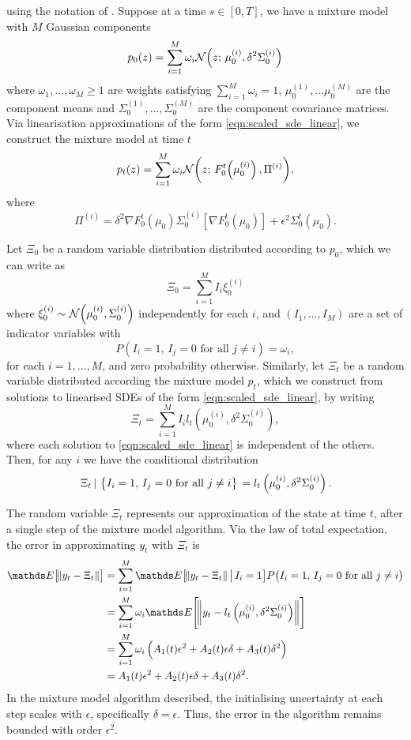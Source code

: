 using the notation of .
Suppose at a time \(s \in [0,T]\), we have a mixture model with \(M\) Gaussian components
\[
	p_0\!\left(z\right) = \sum_{i=1}^{M}{\omega_i\mathcal{N}\!\left(z;\, \mu_0^{(i)}, \delta^2\Sigma_0^{(i)}\right)}
\]
where \(\omega_1,\dotsc, \omega_M \geq 1\) are weights satisfying \(\sum_{i=1}^M{\omega_i} = 1\), \(\mu_0^{(1)}, \dots \mu_0^{(M)}\) are the component means and \(\Sigma_0^{(1)}, \dotsc, \Sigma_0^{(M)}\) are the component covariance matrices.
Via linearisation approximations of the form \eqref{eqn:scaled_sde_linear}, we construct the mixture model at time \(t\)
\[
	p_t\!\left(z\right) = \sum_{i=1}^{M}{\omega_i\mathcal{N}\!\left(z; \, F_0^t\!\left(\mu_0^{(i)}\right), \Pi^{(i)}\right)},
\]
where
\[
	\Pi^{(i)} = \delta^2 \nabla F_0^t\!\left(\mu_0\right) \Sigma_0^{(i)} \left[\nabla F_0^t\!\left(\mu_0\right)\right] + \epsilon^2 \Sigma_0^t\!\left(\mu_0\right).
\]

Let \(\Xi_0\) be a random variable distribution distributed according to \(p_0\), which we can write as
\[
	\Xi_0 = \sum_{i=1}^{M}{I_i \xi_0^{(i)}}
\]
where \(\xi_0^{(i)} \sim\mathcal{N}\!\left(\mu_0^{(i)}, \Sigma_0^{(i)}\right)\) independently for each \(i\), and \(\left(I_1, \dotsc, I_M\right)\) are a set of indicator variables with
\[
	P\!\left(I_i = 1,\, I_j = 0 \text{ for all } j \neq i\right) = \omega_i,
\]
for each \(i = 1,\hdots,M\), and zero probability otherwise.
Similarly, let \(\Xi_t\) be a random variable distributed according the mixture model \(p_t\), which we construct from solutions to linearised SDEs of the form \eqref{eqn:scaled_sde_linear}, by writing
\[
	\Xi_t = \sum_{i=1}^{M}{I_i l_t\!\left(\mu_0^{(i)}, \delta^2\Sigma_0^{(i)}\right)},
\]
where each solution to \eqref{eqn:scaled_sde_linear} is independent of the others.
Then, for any \(i\) we have the conditional distribution
\[
	\left. \Xi_t \, | \, \set{I_i = 1, \, I_j = 0 \text{ for all } j \neq i} \right. = l_{t}\left(\mu_0^{(i)}, \delta^2 \Sigma_0^{(i)}\right).
\]

The random variable \(\Xi_t\) represents our approximation of the state at time \(t\), after a single step of the mixture model algorithm.
Via the law of total expectation, the error in approximating \(y_t\) with \(\Xi_t\) is
\begin{align*}
	\avg{\norm{y_t - \Xi_t}} & = \sum_{i=1}^{M}{\avg{\norm{y_t - \Xi_t}\,\middle|\, I_i = 1}}P\!\left(I_i = 1,\, I_j = 0 \text{ for all } j \neq i\right) \\
	                         & = \sum_{i=1}^{M}{\omega_i\avg{\norm{y_t - l_{t}\left(\mu_0^{(i)}, \delta^2 \Sigma_0^{(i)}\right)}}}                        \\
	                         & = \sum_{i=1}^{M}{\omega_i\left(A_1(t)\epsilon^2 + A_2(t) \epsilon \delta + A_3(t)\delta^2\right)}                          \\
	                         & = A_1(t) \epsilon^2 + A_2(t)\epsilon\delta + A_3(t)\delta^2.
\end{align*}
In the mixture model algorithm described, the initialising uncertainty at each step scales with \(\epsilon\), specifically \(\delta = \epsilon\).
Thus, the error in the algorithm remains bounded with order \(\epsilon^2\).



